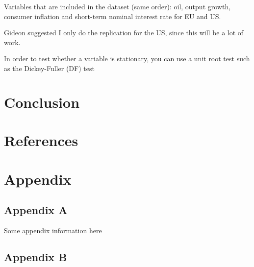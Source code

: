 \documentclass[11pt,preprint, authoryear]{elsarticle}
\numberwithin{equation}{section}
\numberwithin{figure}{section}
\numberwithin{table}{section}
\newlength{\cslhangindent}
\newenvironment{CSLReferences}%
  {\setlength{\parindent}{0pt}%
  \everypar{\setlength{\hangindent}{\cslhangindent}}\ignorespaces}%
  {\par}
\begin{document}
Variables that are included in the dataset (same order): oil, output
growth, consumer inflation and short-term nominal interest rate for EU
and US.

Gideon suggested I only do the replication for the US, since this will
be a lot of work.

In order to test whether a variable is stationary, you can use a unit
root test such as the Dickey-Fuller (DF) test

\hypertarget{conclusion}{%
\section{Conclusion}\label{conclusion}}

\newpage

\hypertarget{references}{%
\section*{References}\label{references}}

\hypertarget{refs}{}
\begin{CSLReferences}{0}{0}
\end{CSLReferences}

\hypertarget{appendix}{%
\section*{Appendix}\label{appendix}}

\hypertarget{appendix-a}{%
\subsection*{Appendix A}\label{appendix-a}}

Some appendix information here

\hypertarget{appendix-b}{%
\subsection*{Appendix B}\label{appendix-b}}


\end{document}
